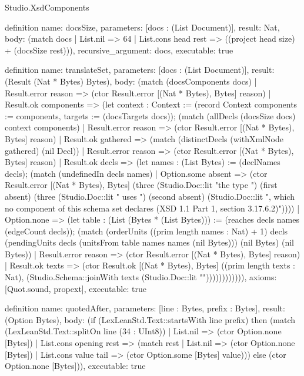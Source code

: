 \begin{lexlean}{Studio.XsdComponents}
\begin{semanticmodule}
definition{
  name: docsSize,
  parameters: [docs : (List Document)],
  result: Nat,
  body: (match docs
    | List.nil => 64
    | List.cons head rest => ((project head size) + (docsSize rest))),
  recursive_argument: docs,
  executable: true
}

definition{
  name: translateSet,
  parameters: [docs : (List Document)],
  result: (Result (Nat * Bytes) Bytes),
  body: (match (docsComponents docs)
    | Result.error reason => (ctor Result.error [(Nat * Bytes), Bytes] reason)
    | Result.ok components => (let context : Context := (record Context {components := components, targets := (docsTargets docs)}); (match (allDecls (docsSize docs) context components)
      | Result.error reason => (ctor Result.error [(Nat * Bytes), Bytes] reason)
      | Result.ok gathered => (match (distinctDecls (withXmlNode gathered) (nil Decl))
        | Result.error reason => (ctor Result.error [(Nat * Bytes), Bytes] reason)
        | Result.ok decls => (let names : (List Bytes) := (declNames decls); (match (undefinedIn decls names)
          | Option.some absent => (ctor Result.error [(Nat * Bytes), Bytes] (three (Studio.Doc::lit "the type ") (first absent) (three (Studio.Doc::lit " uses ") (second absent) (Studio.Doc::lit ", which no component of this schema set declares (XSD 1.1 Part 1, section 3.17.6.2)"))))
          | Option.none => (let table : (List (Bytes * (List Bytes))) := (reaches decls names (edgeCount decls)); (match (orderUnits ((prim length names : Nat) + 1) decls (pendingUnits decls (unitsFrom table names names (nil Bytes))) (nil Bytes) (nil Bytes))
            | Result.error reason => (ctor Result.error [(Nat * Bytes), Bytes] reason)
            | Result.ok texts => (ctor Result.ok [(Nat * Bytes), Bytes] ((prim length texts : Nat), (Studio.Schema::joinWith texts (Studio.Doc::lit "\n")))))))))))),
  axioms: [Quot.sound, propext],
  executable: true
}

definition{
  name: quotedAfter,
  parameters: [line : Bytes, prefix : Bytes],
  result: (Option Bytes),
  body: (if (LexLeanStd.Text::startsWith line prefix) then (match (LexLeanStd.Text::splitOn line (34 : UInt8))
    | List.nil => (ctor Option.none [Bytes])
    | List.cons opening rest => (match rest
      | List.nil => (ctor Option.none [Bytes])
      | List.cons value tail => (ctor Option.some [Bytes] value))) else (ctor Option.none [Bytes])),
  executable: true
}


\end{semanticmodule}
\end{lexlean}
